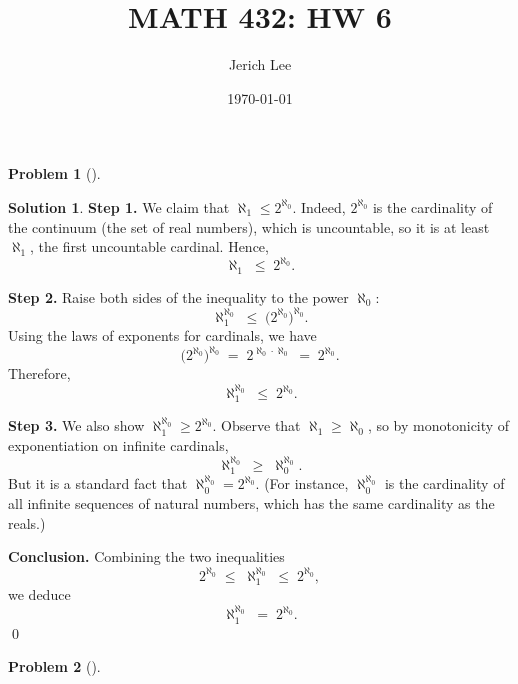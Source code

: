 \documentclass[12pt]{article}
\title{MATH 432: HW 6}
\author{Jerich Lee}
\date{\today}
\theoremstyle{definition} %
\newtheorem{solution}{Solution}
\newtheorem{problem}{Problem}
\theoremstyle{plain} %
\begin{document}
\maketitle
\begin{problem}[]
    
\end{problem}
\begin{solution}
   

\noindent
\textbf{Step 1.} We claim that $\aleph_1 \le 2^{\aleph_0}$. 
Indeed, $2^{\aleph_0}$ is the cardinality of the continuum (the set of real numbers), 
which is uncountable, so it is at least $\aleph_1$, the first uncountable cardinal. 
Hence,
\[
\aleph_1 \;\le\; 2^{\aleph_0}.
\]

\medskip
\noindent
\textbf{Step 2.} Raise both sides of the inequality to the power $\aleph_0$:
\[
\aleph_1^{\aleph_0} \;\le\; \bigl(2^{\aleph_0}\bigr)^{\aleph_0}.
\]
Using the laws of exponents for cardinals, we have
\[
\bigl(2^{\aleph_0}\bigr)^{\aleph_0}
\;=\;
2^{\aleph_0 \cdot \aleph_0}
\;=\;
2^{\aleph_0}.
\]
Therefore,
\[
\aleph_1^{\aleph_0} \;\le\; 2^{\aleph_0}.
\]

\medskip
\noindent
\textbf{Step 3.} We also show $\aleph_1^{\aleph_0} \ge 2^{\aleph_0}$. 
Observe that $\aleph_1 \ge \aleph_0$, so by monotonicity of exponentiation
on infinite cardinals,
\[
\aleph_1^{\aleph_0} \;\ge\; \aleph_0^{\aleph_0}.
\]
But it is a standard fact that $\aleph_0^{\aleph_0} = 2^{\aleph_0}$. 
(For instance, $\aleph_0^{\aleph_0}$ is the cardinality of all infinite
sequences of natural numbers, which has the same cardinality 
as the reals.)

\medskip
\noindent
\textbf{Conclusion.} Combining the two inequalities
\[
2^{\aleph_0} \;\le\; \aleph_1^{\aleph_0} \;\le\; 2^{\aleph_0},
\]
we deduce
\[
\aleph_1^{\aleph_0} \;=\; 2^{\aleph_0}.
\]
\qed 
\end{solution}
\begin{problem}[]
    
\end{problem}
\end{document}
